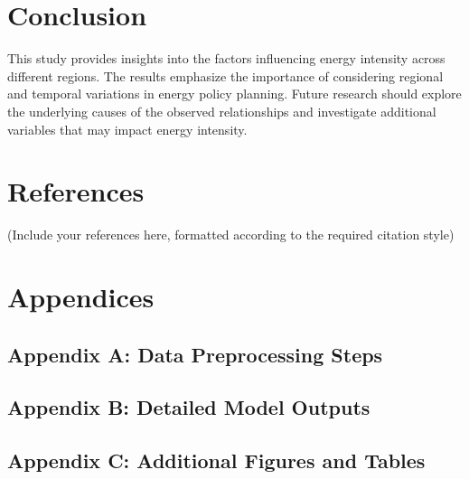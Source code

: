 \documentclass[
]{report}
\begin{document}
\hypertarget{conclusion}{%
\chapter{Conclusion}\label{conclusion}}

This study provides insights into the factors influencing energy
intensity across different regions. The results emphasize the importance
of considering regional and temporal variations in energy policy
planning. Future research should explore the underlying causes of the
observed relationships and investigate additional variables that may
impact energy intensity.

\hypertarget{references}{%
\chapter{References}\label{references}}

(Include your references here, formatted according to the required
citation style)

\hypertarget{appendices}{%
\chapter{Appendices}\label{appendices}}

\hypertarget{appendix-a-data-preprocessing-steps}{%
\section{Appendix A: Data Preprocessing
Steps}\label{appendix-a-data-preprocessing-steps}}

\hypertarget{appendix-b-detailed-model-outputs}{%
\section{Appendix B: Detailed Model
Outputs}\label{appendix-b-detailed-model-outputs}}

\hypertarget{appendix-c-additional-figures-and-tables}{%
\section{Appendix C: Additional Figures and
Tables}\label{appendix-c-additional-figures-and-tables}}
\end{document}
